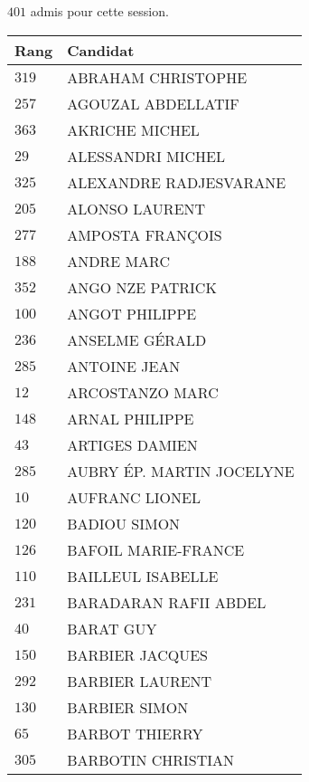 




  $401$ admis pour cette session.

  \begin{xltabular}{\linewidth}{|l|X|}
    \hline
    \textbf{Rang} & \textbf{Candidat} \\
    \hline
    $319$ & ABRAHAM CHRISTOPHE \\
    \hline
    $257$ & AGOUZAL ABDELLATIF \\
    \hline
    $363$ & AKRICHE MICHEL \\
    \hline
    $29$ & ALESSANDRI MICHEL \\
    \hline
    $325$ & ALEXANDRE RADJESVARANE \\
    \hline
    $205$ & ALONSO LAURENT \\
    \hline
    $277$ & AMPOSTA FRANÇOIS \\
    \hline
    $188$ & ANDRE MARC \\
    \hline
    $352$ & ANGO NZE PATRICK \\
    \hline
    $100$ & ANGOT PHILIPPE \\
    \hline
    $236$ & ANSELME GÉRALD \\
    \hline
    $285$ & ANTOINE JEAN \\
    \hline
    $12$ & ARCOSTANZO MARC \\
    \hline
    $148$ & ARNAL PHILIPPE \\
    \hline
    $43$ & ARTIGES DAMIEN \\
    \hline
    $285$ & AUBRY ÉP. MARTIN JOCELYNE \\
    \hline
    $10$ & AUFRANC LIONEL \\
    \hline
    $120$ & BADIOU SIMON \\
    \hline
    $126$ & BAFOIL MARIE-FRANCE \\
    \hline
    $110$ & BAILLEUL ISABELLE \\
    \hline
    $231$ & BARADARAN RAFII ABDEL \\
    \hline
    $40$ & BARAT GUY \\
    \hline
    $150$ & BARBIER JACQUES \\
    \hline
    $292$ & BARBIER LAURENT \\
    \hline
    $130$ & BARBIER SIMON \\
    \hline
    $65$ & BARBOT THIERRY \\
    \hline
    $305$ & BARBOTIN CHRISTIAN \\

\end{xltabular}

